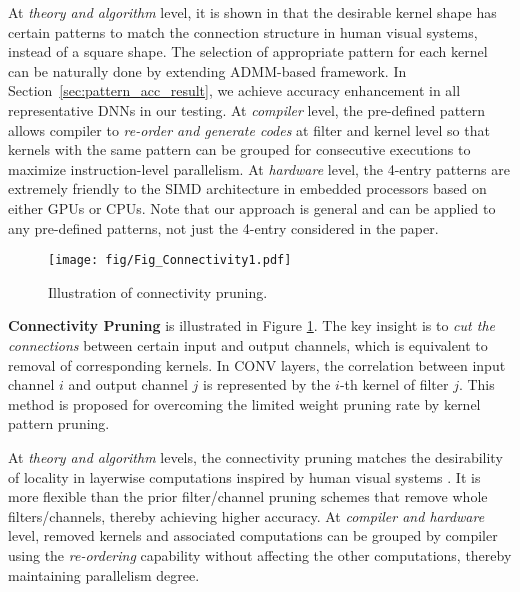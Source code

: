 \documentclass[sigplan,screen]{acmart}
\begin{document}
At {\em theory and algorithm} level, it is shown in {\cite{li2017pruning,lebedev2016fast}} that the desirable kernel shape has certain patterns 
to match the connection structure in human 
visual systems,
instead of a square shape.
The selection of appropriate pattern for each kernel
can be naturally done by extending 
ADMM-based framework.
In Section~\ref{sec:pattern_acc_result}, we achieve 
accuracy enhancement in all representative 
DNNs in our testing.
At {\em compiler} level, 
the pre-defined pattern allows compiler to 
{\em re-order and generate codes} at filter and kernel level so that kernels with the same pattern
can be grouped for consecutive executions to
maximize instruction-level parallelism.
At {\em hardware} level, the 4-entry patterns are extremely friendly to the SIMD architecture in embedded processors based on either
GPUs or CPUs.
Note that our approach is general and can be 
applied to any pre-defined patterns, not just
the 4-entry considered in the paper. 






\begin{figure}\centering
    \texttt{[image: fig/Fig\_Connectivity1.pdf]}
\caption{Illustration of connectivity pruning.}
    \label{fig:connectivity}
\end{figure}

\textbf{Connectivity Pruning} is illustrated in {Figure \ref{fig:connectivity}}.
The key insight is to {\em cut the connections}
between certain input and output channels, which is equivalent to removal of corresponding kernels. 
In CONV layers, the correlation between input channel $i$ and output channel $j$ is represented by the $i$-th kernel of filter $j$.
This method is proposed for overcoming the limited weight pruning rate by kernel pattern pruning.





At {\em theory and algorithm} levels, the connectivity pruning matches the desirability of locality in layerwise computations inspired by human visual systems \cite{yamins2016using,yamins2014performance}. It is more flexible than the prior filter/channel pruning schemes that remove whole filters/channels, thereby achieving higher accuracy. At {\em compiler and hardware} level, removed kernels and associated computations can be grouped by compiler using the \emph{re-ordering} capability without affecting the other computations, thereby maintaining parallelism degree.
\end{document}
